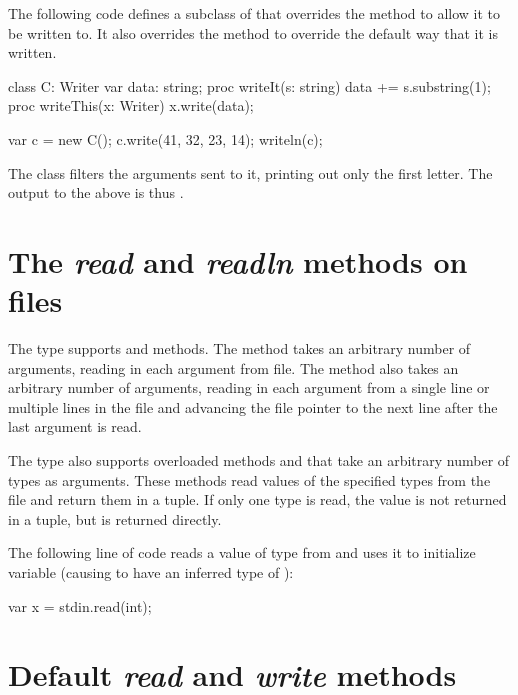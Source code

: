 \begin{example}
The following code defines a subclass of  that overrides
the  method to allow it to be written to.  It also
overrides the  method to override the default way that
it is written.
\begin{chapel}
class C: Writer {
  var data: string;
  proc writeIt(s: string) {
    data += s.substring(1);
  }
  proc writeThis(x: Writer) {
    x.write(data);
  }
}

var c = new C();
c.write(41, 32, 23, 14);
writeln(c);
\end{chapel}
The  class filters the arguments sent to it, printing out only
the first letter.  The output to the above is thus .
\end{example}


\section{The {\em read} and {\em readln} methods on files}
\label{fileread}

The  type supports  and  methods.
The  method takes an arbitrary number of arguments, reading
in each argument from file.  The  method also
takes an arbitrary number of arguments, reading in each argument
from a single line or multiple lines in the file and 
advancing the file pointer to the next line after the last argument 
is read.

The  type also supports overloaded methods 
and  that take an arbitrary number of types as arguments.
These methods read values of the specified types from the file and
return them in a tuple.  If only one type is read, the value is not
returned in a tuple, but is returned directly.

\begin{example}
The following line of code reads a value of type  from
 and uses it to initialize variable  (causing
 to have an inferred type of ):
\begin{chapel}
var x = stdin.read(int);
\end{chapel}
\end{example}


\section{Default {\em read} and {\em write} methods}


